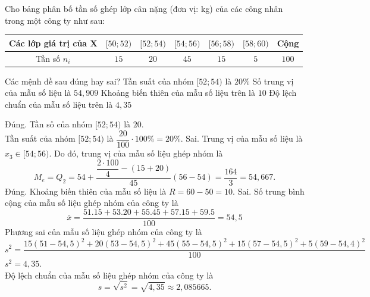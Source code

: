 \begin{ex}%
	Cho bảng phân bố tần số ghép lớp cân nặng (đơn vị: kg) của các công nhân trong một công ty như sau:
	\begin{center}
		\begin{tabular}{|c|c|c|c|c|c|c|}
			\hline Các lớp giá trị của X & {$[50 ; 52)$} & {$[52 ; 54)$} & {$[54 ; 56)$} & {$[56 ; 58)$} & {$[58 ; 60)$} & Cộng \\
			\hline Tần số $n_i$ & $15$ & $20$ & $45$ & $15$ & $5$ & $100$ \\
			\hline
		\end{tabular}
	\end{center}
	Các mệnh đề sau đúng hay sai?
	\choiceTF
	{\True Tần suất của nhóm $[52;54)$ là $20\%$}
	{Số trung vị của mẫu số liệu là $54{,}909$}
	{\True Khoảng biến thiên của mẫu số liệu trên là $10$}
	{Độ lệch chuẩn của mẫu số liệu trên là $4{,}35$}
	\loigiai
	{
		\begin{itemchoice}
			\itemch Đúng. Tần số của nhóm $[52 ; 54)$ là $20$.\\
			Tần suất của nhóm $[52 ; 54)$ là $\dfrac{20}{100} \cdot 100 \%=20 \%$.
			\itemch  Sai. Trung vị của mẫu số liệu là $x_3 \in[54 ; 56)$. Do đó, trung vị của mẫu số liệu ghép nhóm là
			$$
			M_e=Q_2=54+\dfrac{\dfrac{2 \cdot 100}{4}-(15+20)}{45}(56-54)=\dfrac{164}{3}=54{,}667.
			$$
			\itemch Đúng.  Khoảng biến thiên của mẫu số liệu là $R=60-50=10$.
			\itemch Sai. Số trung bình cộng của mẫu số liệu ghép nhóm của công ty là
			$$
			\bar{x}=\dfrac{51.15+53.20+55.45+57.15+59.5}{100}=54{,}5
			$$
			Phương sai của mẫu số liệu ghép nhóm của công ty là
			$$
			s^2=\frac{15 (51-54{,}5)^2+20(53-54{,}5)^2+45(55-54{,}5)^2+15(57-54{,}5)^2+5(59-54{,}4)^2}{100}
			$$
			$s^2=4,35$.\\
			Độ lệch chuẩn của mẫu số liệu ghép nhóm của công ty là $$s=\sqrt{s^2}=\sqrt{4{,}35} \approx 2{,}085665.$$
		\end{itemchoice}
	}
\end{ex}

